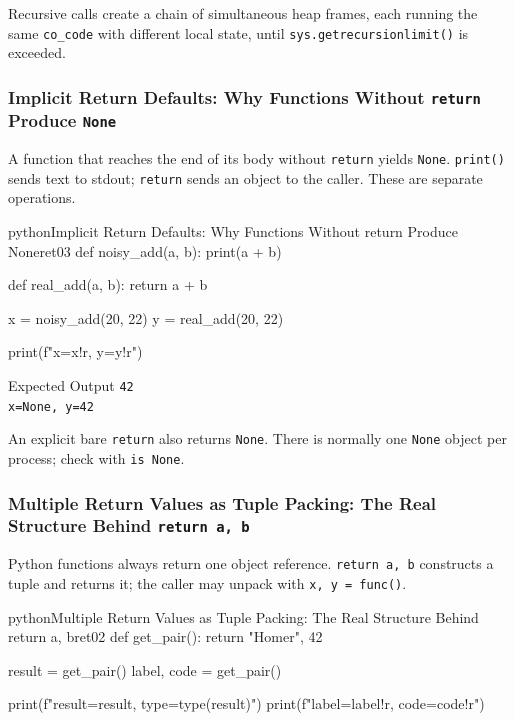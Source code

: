 \documentclass[a4paper,twoside]{report}
\begin{document}
Recursive calls create a chain of simultaneous heap frames, each running the same \texttt{co\_code} with different local state, until \texttt{sys.getrecursionlimit()} is exceeded.

\subsubsection{Implicit Return Defaults: Why Functions Without \texttt{return} Produce \texttt{None}}

A function that reaches the end of its body without \texttt{return} yields \texttt{None}. \texttt{print()} sends text to stdout; \texttt{return} sends an object to the caller. These are separate operations.

\begin{codebox}[]{python}{Implicit Return Defaults: Why Functions Without return Produce None}{ret03}
def noisy_add(a, b):
    print(a + b)

def real_add(a, b):
    return a + b

x = noisy_add(20, 22)
y = real_add(20, 22)

print(f"x={x!r}, y={y!r}")
\end{codebox}


\begin{iobox}{Expected Output}
\texttt{42} \\
\texttt{x=None, y=42} \\
\end{iobox}




An explicit bare \texttt{return} also returns \texttt{None}. There is normally one \texttt{None} object per process; check with \texttt{is None}.

\subsubsection{Multiple Return Values as Tuple Packing: The Real Structure Behind \texttt{return a, b}}

Python functions always return one object reference. \texttt{return a, b} constructs a tuple and returns it; the caller may unpack with \texttt{x, y = func()}.

\begin{codebox}[]{python}{Multiple Return Values as Tuple Packing: The Real Structure Behind return a, b}{ret02}
def get_pair():
    return "Homer", 42

result = get_pair()
label, code = get_pair()

print(f"result={result}, type={type(result)}")
print(f"label={label!r}, code={code!r}")
\end{codebox}
\end{document}
